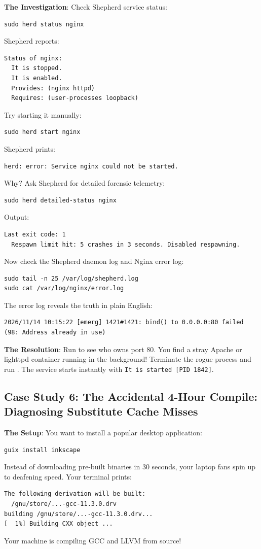 \textbf{The Investigation}:
Check Shepherd service status:
\begin{lstlisting}[style=guixcli]
sudo herd status nginx
\end{lstlisting}
Shepherd reports:
\begin{lstlisting}[style=guixcli]
Status of nginx:
  It is stopped.
  It is enabled.
  Provides: (nginx httpd)
  Requires: (user-processes loopback)
\end{lstlisting}
Try starting it manually:
\begin{lstlisting}[style=guixcli]
sudo herd start nginx
\end{lstlisting}
Shepherd prints:
\begin{lstlisting}[style=guixcli]
herd: error: Service nginx could not be started.
\end{lstlisting}

Why? Ask Shepherd for detailed forensic telemetry:
\begin{lstlisting}[style=guixcli]
sudo herd detailed-status nginx
\end{lstlisting}
Output:
\begin{lstlisting}[style=guixcli]
  Last exit code: 1
  Respawn limit hit: 5 crashes in 3 seconds. Disabled respawning.
\end{lstlisting}

Now check the Shepherd daemon log and Nginx error log:
\begin{lstlisting}[style=guixcli]
sudo tail -n 25 /var/log/shepherd.log
sudo cat /var/log/nginx/error.log
\end{lstlisting}
The error log reveals the truth in plain English:
\begin{lstlisting}[style=guixcli]
2026/11/14 10:15:22 [emerg] 1421#1421: bind() to 0.0.0.0:80 failed (98: Address already in use)
\end{lstlisting}

\textbf{The Resolution}:
Run  to see who owns port 80. You find a stray Apache or lighttpd container running in the background! Terminate the rogue process and run . The service starts instantly with \texttt{It is started [PID 1842]}.

\subsection{Case Study 6: The Accidental 4-Hour Compile: Diagnosing Substitute Cache Misses}

\textbf{The Setup}: You want to install a popular desktop application:
\begin{lstlisting}[style=guixcli]
guix install inkscape
\end{lstlisting}
Instead of downloading pre-built binaries in 30 seconds, your laptop fans spin up to deafening speed. Your terminal prints:
\begin{lstlisting}[style=guixcli]
The following derivation will be built:
  /gnu/store/...-gcc-11.3.0.drv
building /gnu/store/...-gcc-11.3.0.drv...
[  1%] Building CXX object ...
\end{lstlisting}
Your machine is compiling GCC and LLVM from source!

